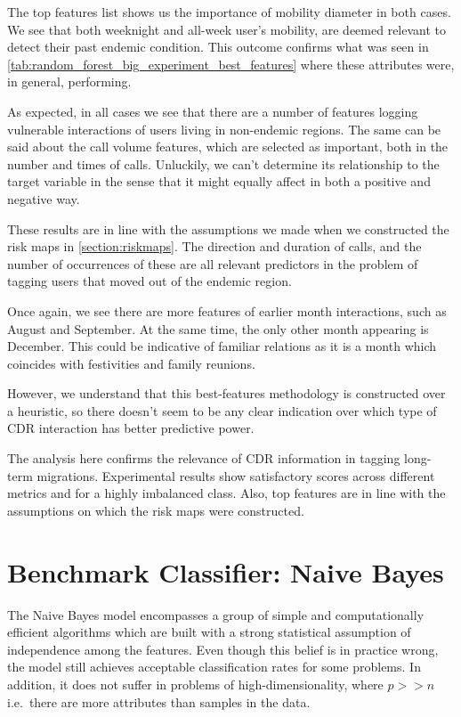 The top features list shows us the importance of mobility diameter in both cases.
We see that both weeknight and all-week user's mobility, are deemed relevant to detect their past endemic condition.
This outcome confirms what was seen in \cref{tab:random_forest_big_experiment_best_features} where these attributes were, in general, performing.

As expected, in all cases we see that there are a number of features logging vulnerable interactions of users living in non-endemic regions.
The same can be said about the call volume features, which are selected as important, both in the number and times of calls.
Unluckily, we can't determine its relationship to the target variable in the sense that it might equally affect in both a positive and negative way.

These results are in line with the assumptions we made when we constructed the risk maps in \cref{section:riskmaps}.
The direction and duration of calls, and the number of occurrences of these are all relevant predictors in the problem of tagging users that moved out of the endemic region.

Once again, we see there are more features of earlier month interactions, such as August and September.
At the same time, the only other month appearing is December.
This could be indicative of familiar relations as it is a month which coincides with festivities and family reunions.

However, we understand that this best-features methodology is constructed over a heuristic, so there doesn't seem to be any clear indication over which type of CDR interaction has better predictive power.

The analysis here confirms the relevance of CDR information in tagging long-term migrations.
Experimental results show satisfactory scores across different metrics and for a highly imbalanced class.
Also, top features are in line with the assumptions on which the risk maps were constructed.


\section{Benchmark Classifier: Naive Bayes}\label{section:naive_bayes}

The Naive Bayes model encompasses a group of simple and computationally efficient algorithms which are built with a strong statistical assumption of independence among the features.
Even though this belief is in practice wrong, the model still achieves acceptable classification rates for some problems.
In addition, it does not suffer in problems of high-dimensionality, where $p >> n$ i.e.\ there are more attributes than samples in the data.

